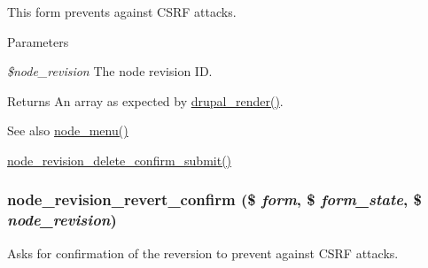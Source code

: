 This form prevents against CSRF attacks.


\begin{DoxyParams}{Parameters}
\item[{\em \$node\_\-revision}]The node revision ID.\end{DoxyParams}
\begin{DoxyReturn}{Returns}
An array as expected by \hyperlink{common_8inc_a05798b44e8d6c496d4bee5cc32fa7851}{drupal\_\-render()}.
\end{DoxyReturn}
\begin{DoxySeeAlso}{See also}
\hyperlink{node_8module_a15e8d85a7559f22b8f2c77c1d5dfac63}{node\_\-menu()} 

\hyperlink{node_8pages_8inc_ad6e0dfda7fccc07dfd93dd257e8ed99f}{node\_\-revision\_\-delete\_\-confirm\_\-submit()} 
\end{DoxySeeAlso}
\hypertarget{group__forms_ga755acf87a0cd1c4d9d457843656c397b}{
\subsubsection[{node\_\-revision\_\-revert\_\-confirm}]{\setlength{\rightskip}{0pt plus 5cm}node\_\-revision\_\-revert\_\-confirm (\$ {\em form}, \/  \$ {\em form\_\-state}, \/  \$ {\em node\_\-revision})}}
\label{group__forms_ga755acf87a0cd1c4d9d457843656c397b}
Asks for confirmation of the reversion to prevent against CSRF attacks.


